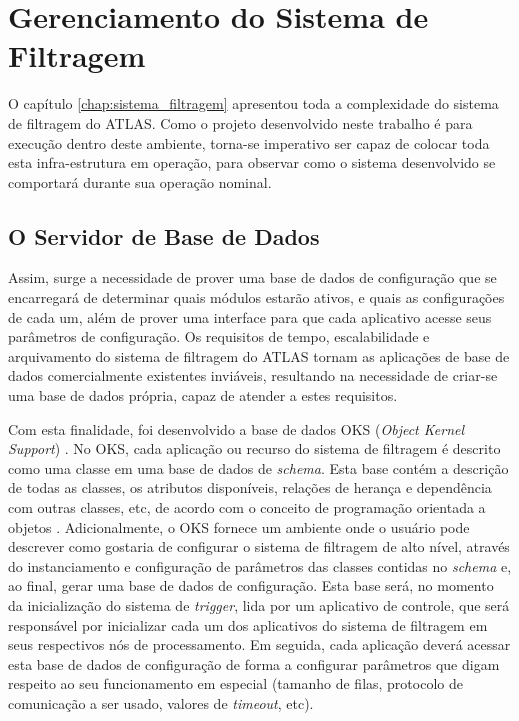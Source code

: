 \chapter{Gerenciamento do Sistema de Filtragem}
\label{chap:pm}

O capítulo \ref{chap:sistema_filtragem} apresentou toda a complexidade do sistema de filtragem do ATLAS. Como o projeto desenvolvido neste trabalho é para execução dentro deste ambiente, torna-se imperativo ser capaz de colocar toda esta infra-estrutura em operação, para observar como o sistema desenvolvido se comportará durante sua operação nominal. 


\section{O Servidor de Base de Dados}
\label{sec:oks}

Assim, surge a necessidade de prover uma base de dados de configuração que se encarregará de determinar quais módulos estarão ativos, e quais as configurações de cada um, além de prover uma interface para que cada aplicativo acesse seus parâmetros de configuração. Os requisitos de tempo, escalabilidade e arquivamento do sistema de filtragem do ATLAS tornam as aplicações de base de dados comercialmente existentes inviáveis, resultando na necessidade de criar-se uma base de dados própria, capaz de atender a estes requisitos. 

Com esta finalidade, foi desenvolvido a base de dados OKS (\emph{Object Kernel Support}) \cite{bib:oks}. No OKS, cada aplicação ou recurso do sistema de filtragem é descrito como uma classe em uma base de dados de \emph{schema}. Esta base contém a descrição de todas as classes, os atributos disponíveis, relações de herança e dependência com outras classes, etc, de acordo com o conceito de programação orientada a objetos \cite{bib:poo}. Adicionalmente, o OKS fornece um ambiente onde o usuário pode descrever como gostaria de configurar o sistema de filtragem de alto nível, através do instanciamento e configuração de parâmetros das classes contidas no \emph{schema} e, ao final, gerar uma base de dados de configuração. Esta base será, no momento da inicialização do sistema de \emph{trigger}, lida por um aplicativo de controle, que será responsável por inicializar cada um dos aplicativos do sistema de filtragem em seus respectivos nós de processamento. Em seguida, cada aplicação deverá acessar esta base de dados de configuração de forma a configurar parâmetros que digam respeito ao seu funcionamento em especial (tamanho de filas, protocolo de comunicação a ser usado, valores de \emph{timeout}, etc).  

